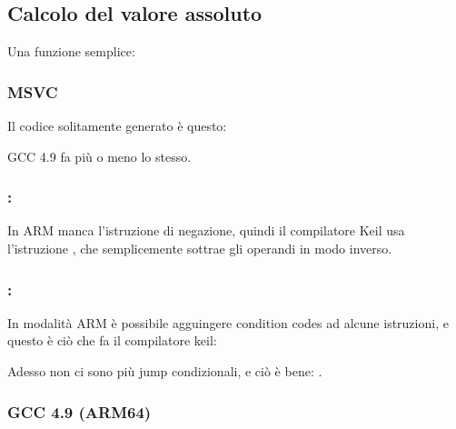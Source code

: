 \subsection{Calcolo del valore assoluto}
\label{sec:abs}

Una funzione semplice:



\subsubsection{\Optimizing MSVC}

Il codice solitamente generato è questo:



GCC 4.9 fa più o meno lo stesso.

\subsubsection{\OptimizingKeilVI: \ThumbMode}




In ARM manca l'istruzione di negazione, quindi il compilatore Keil usa l'istruzione , che semplicemente sottrae gli operandi in modo inverso.

\subsubsection{\OptimizingKeilVI: \ARMMode}

In modalità ARM è possibile agguingere condition codes ad alcune istruzioni, e questo è ciò che fa il compilatore keil:



Adesso non ci sono più jump condizionali, e ciò è bene: .

\subsubsection{\NonOptimizing GCC 4.9 (ARM64)}


